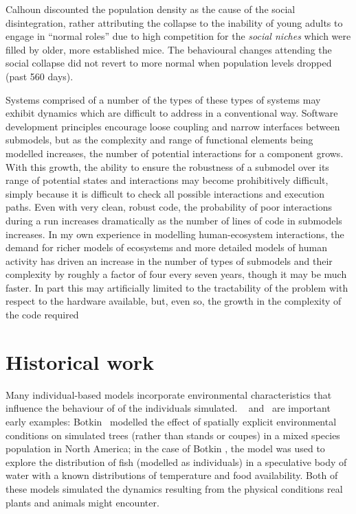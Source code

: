 Calhoun discounted the population density as the cause of the social
disintegration, rather attributing the collapse to the inability of
young adults to engage in ``normal roles'' due to high competition for
the \emph{social niches} which were filled by older, more established
mice. The behavioural changes attending the social collapse did not revert
to more normal when population levels dropped (past 560 days).

Systems comprised of a number of the types of these types of systems
may exhibit dynamics which are difficult to address in a conventional
way. Software development principles encourage loose coupling and
narrow interfaces between submodels, but as the complexity and range
of functional elements being modelled increases, the number of
potential interactions for a component grows.  With this growth, the
ability to ensure the robustness of a submodel over its range of
potential states and interactions may become prohibitively difficult,
simply because it is difficult to check all possible interactions and
execution paths.  Even with very clean, robust code, the probability
of poor interactions during a run increases dramatically as the number
of lines of code in submodels increases. In my own experience in
modelling human-ecosystem interactions, the demand for richer models
of ecosystems and more detailed models of human activity has driven an
increase in the number of types of submodels and their complexity by
roughly a factor of four every seven years, though it may be much
faster.  In part this may artificially limited to the tractability of
the problem with respect to the hardware available, but, even so, the
growth in the complexity of the code required


\section{Historical work}

Many individual-based models incorporate environmental characteristics
that influence the behaviour of of the individuals
simulated. ~\citet{Botkin72:2} and~\citet{deangelis1978model} are
important early examples: Botkin \etal\ modelled the effect of
spatially explicit environmental conditions on simulated trees (rather
than stands or coupes) in a mixed species population in
North America; in the case of Botkin \etal, the model was used to
explore the distribution of fish (modelled as individuals) in a
speculative body of water with a known distributions of temperature
and food availability. Both of these models simulated the 
dynamics resulting from the physical conditions real plants and
animals might encounter. 

